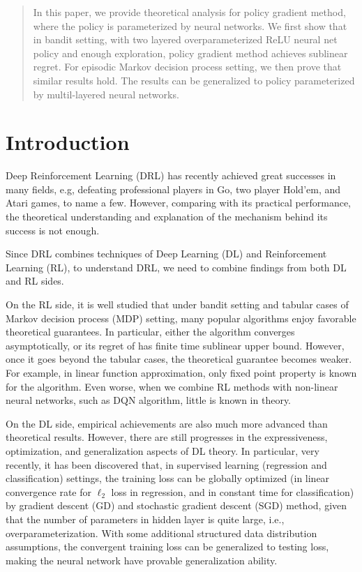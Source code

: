 \documentclass{article}
\begin{document}
\printAffiliationsAndNotice{\icmlEqualContribution} %

\begin{abstract}
In this paper, we provide theoretical analysis for policy gradient method, where the policy is parameterized by neural networks. We first show that in bandit setting, with two layered overparameterized ReLU neural net policy and enough exploration, policy gradient method achieves sublinear regret. For episodic Markov decision process setting, we then prove that similar results hold. The results can be generalized to policy parameterized by multil-layered neural networks.
\end{abstract}

\section{Introduction}
\label{submission}

Deep Reinforcement Learning (DRL) has recently achieved great successes in many fields, e.g, defeating professional players in Go, two player Hold'em, and Atari games, to name a few. However, comparing with its practical performance, the theoretical understanding and explanation of the mechanism behind its success is not enough.

Since DRL combines techniques of Deep Learning (DL) and Reinforcement Learning (RL), to understand DRL, we need to combine findings from both DL and RL sides.

On the RL side, it is well studied that under bandit setting and tabular cases of Markov decision process (MDP) setting, many popular algorithms enjoy favorable theoretical guarantees. In particular, either the algorithm converges asymptotically, or its regret of has finite time sublinear upper bound. However, once it goes beyond the tabular cases, the theoretical guarantee becomes weaker. For example, in linear function approximation, only fixed point property is known for the algorithm. Even worse, when we combine RL methods with non-linear neural networks, such as DQN algorithm, little is known in theory.

On the DL side, empirical achievements are also much more advanced than theoretical results. However, there are still progresses in the expressiveness, optimization, and generalization aspects of DL theory. In particular, very recently, it has been discovered that, in supervised learning (regression and classification) settings, the training loss can be globally optimized (in linear convergence rate for $\ell_2$ loss in regression, and in constant time for classification) by gradient descent (GD) and stochastic gradient descent (SGD) method, given that the number of parameters in hidden layer is quite large, i.e., overparameterization. With some additional structured data distribution assumptions, the convergent training loss can be generalized to testing loss, making the neural network have provable generalization ability. 
\end{document}
